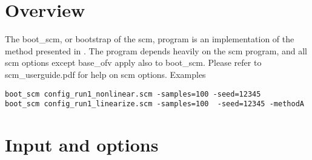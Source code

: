 




\maketitle

\newcommand{\guidetoolname}{boot\_scm}

\section{Overview}

The boot\_scm, or bootstrap of the scm,
program is an implementation of the method presented in \cite{Keizer2}.
The program depends heavily on the scm program, and all scm options except base\_ofv
apply also to boot\_scm. Please refer to scm\_userguide.pdf for help on scm options.
Examples
\begin{verbatim}
boot_scm config_run1_nonlinear.scm -samples=100 -seed=12345
boot_scm config_run1_linearize.scm -samples=100  -seed=12345 -methodA
\end{verbatim}

\section{Input and options}

